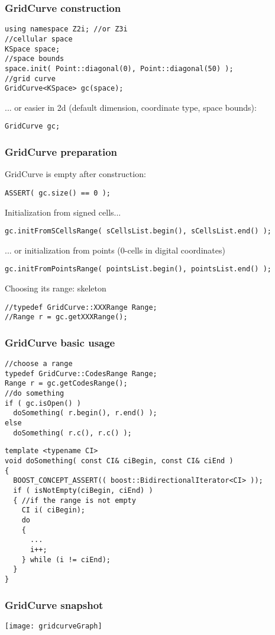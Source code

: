 
\begin{frame}[containsverbatim]
  \frametitle{GridCurve construction}

  \begin{lstlisting}
using namespace Z2i; //or Z3i
//cellular space
KSpace space;                 
//space bounds
space.init( Point::diagonal(0), Point::diagonal(50) );
//grid curve 
GridCurve<KSpace> gc(space); 
  \end{lstlisting}
... or easier in 2d (default dimension, coordinate type, space bounds): 
  \begin{lstlisting}
GridCurve gc; 
  \end{lstlisting}

\end{frame}


\begin{frame}[containsverbatim]
  \frametitle{GridCurve preparation}

GridCurve is empty after construction: 
  \begin{lstlisting}
ASSERT( gc.size() == 0 ); 
  \end{lstlisting}

Initialization from signed cells... 
  \begin{lstlisting}
gc.initFromSCellsRange( sCellsList.begin(), sCellsList.end() ); 
  \end{lstlisting}

... or initialization from points ($0$-cells in digital coordinates)
  \begin{lstlisting}
gc.initFromPointsRange( pointsList.begin(), pointsList.end() ); 
  \end{lstlisting}

Choosing its range: skeleton 
  \begin{lstlisting}
//typedef GridCurve::XXXRange Range; 
//Range r = gc.getXXXRange();
  \end{lstlisting}


\end{frame}

\begin{frame}[containsverbatim]
  \frametitle{GridCurve basic usage}

  \begin{lstlisting}
//choose a range
typedef GridCurve::CodesRange Range; 
Range r = gc.getCodesRange();
//do something 
if ( gc.isOpen() ) 
  doSomething( r.begin(), r.end() ); 
else 
  doSomething( r.c(), r.c() ); 
  \end{lstlisting}

  \begin{lstlisting}
template <typename CI>
void doSomething( const CI& ciBegin, const CI& ciEnd ) 
{
  BOOST_CONCEPT_ASSERT(( boost::BidirectionalIterator<CI> ));
  if ( isNotEmpty(ciBegin, ciEnd) ) 
  { //if the range is not empty
    CI i( ciBegin); 
    do 
    {
      ...
      i++;
    } while (i != ciEnd);
  }    
}
  \end{lstlisting}


\end{frame}

\begin{frame}
  \frametitle{GridCurve snapshot}

   \texttt{[image: gridcurveGraph]}

\end{frame}


